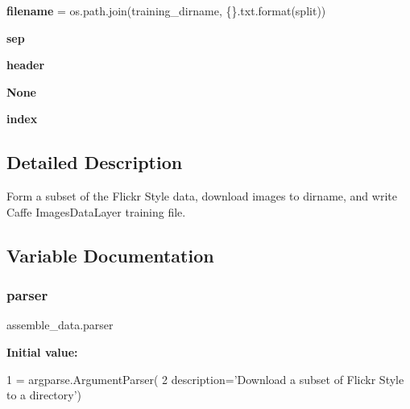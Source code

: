 \begin{DoxyCompactItemize}
{\bfseries filename} = os.\+path.\+join(training\+\_\+dirname, \textquotesingle{}\{\}.txt\textquotesingle{}.format(split))
\item 
\mbox{\label{namespaceassemble__data_abc934db5a387c23246a7531631d15253}} 
{\bfseries sep}
\item 
\mbox{\label{namespaceassemble__data_ae06f7754ea2e5969c9c97876d714bc35}} 
{\bfseries header}
\item 
\mbox{\label{namespaceassemble__data_acf1b7b4caeba0f99047aa81c58db3916}} 
{\bfseries None}
\item 
\mbox{\label{namespaceassemble__data_ad2bfd3db7aa8e84ef69382d9e4dd69b9}} 
{\bfseries index}
\end{DoxyCompactItemize}


\subsection{Detailed Description}
\begin{DoxyVerb}Form a subset of the Flickr Style data, download images to dirname, and write
Caffe ImagesDataLayer training file.
\end{DoxyVerb}
 

\subsection{Variable Documentation}
\mbox{\label{namespaceassemble__data_aa6514f87207a8dcad5471683c5e7eeaf}} 
\subsubsection{\texorpdfstring{parser}{parser}}
{\footnotesize\ttfamily assemble\+\_\+data.\+parser}

{\bfseries Initial value\+:}
\begin{DoxyCode}
1 =  argparse.ArgumentParser(
2         description=\textcolor{stringliteral}{'Download a subset of Flickr Style to a directory'})
\end{DoxyCode}
